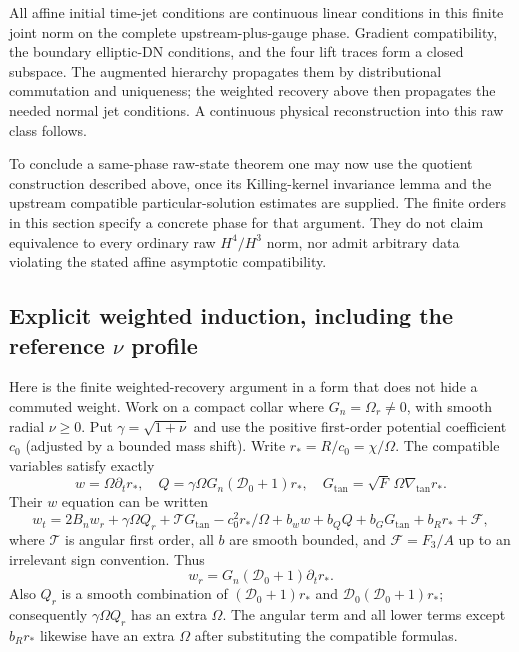 All affine initial time-jet conditions are continuous linear conditions in this finite joint norm on the complete upstream-plus-gauge phase. Gradient compatibility, the boundary elliptic-DN conditions, and the four lift traces form a closed subspace. The augmented hierarchy propagates them by distributional commutation and uniqueness; the weighted recovery above then propagates the needed normal jet conditions. A continuous physical reconstruction into this raw class follows.

To conclude a same-phase raw-state theorem one may now use the quotient construction described above, once its Killing-kernel invariance lemma and the upstream compatible particular-solution estimates are supplied. The finite orders in this section specify a concrete phase for that argument. They do not claim equivalence to every ordinary raw $H^4/H^3$ norm, nor admit arbitrary data violating the stated affine asymptotic compatibility.
\subsection{Explicit weighted induction, including the reference $\nu$ profile}
Here is the finite weighted-recovery argument in a form that does not hide a commuted weight. Work on a compact collar where $G_n=\Omega_r\ne0$, with smooth radial $\nu\ge0$. Put $\gamma=\sqrt{1+\nu}$ and use the positive first-order potential coefficient $c_0$ (adjusted by a bounded mass shift). Write $r_*=R/c_0=\chi/\Omega$. The compatible variables satisfy exactly
\[
 w=\Omega\partial_t r_*,\quad
 Q=\gamma\Omega G_n(\mathcal D_0+1)r_*,\quad
 G_{\tan}=\sqrt F\,\Omega\nabla_{\tan}r_*.
\]
Their $w$ equation can be written
\begin{equation}
 w_t=2B_n w_r+\gamma\Omega Q_r+
 \mathcal T G_{\tan}-c_0^2 r_*/\Omega+
 b_w w+b_QQ+b_GG_{\tan}+b_Rr_*+\mathcal F,\label{weightw}
\end{equation}
where $\mathcal T$ is angular first order, all $b$ are smooth bounded, and $\mathcal F=F_3/A$ up to an irrelevant sign convention. Thus
\[
 w_r=G_n(\mathcal D_0+1)\partial_t r_*.
\]
Also $Q_r$ is a smooth combination of $(\mathcal D_0+1)r_*$ and $\mathcal D_0(\mathcal D_0+1)r_*$; consequently $\gamma\Omega Q_r$ has an extra $\Omega$. The angular term and all lower terms except $b_Rr_*$ likewise have an extra $\Omega$ after substituting the compatible formulas.

